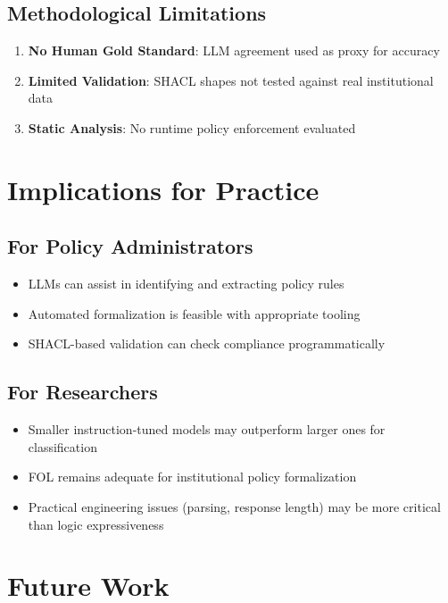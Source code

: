 \subsection{Methodological Limitations}

\begin{enumerate}
    \item \textbf{No Human Gold Standard}: LLM agreement used as proxy for accuracy
    \item \textbf{Limited Validation}: SHACL shapes not tested against real institutional data
    \item \textbf{Static Analysis}: No runtime policy enforcement evaluated
\end{enumerate}

\section{Implications for Practice}

\subsection{For Policy Administrators}

\begin{itemize}
    \item LLMs can assist in identifying and extracting policy rules
    \item Automated formalization is feasible with appropriate tooling
    \item SHACL-based validation can check compliance programmatically
\end{itemize}

\subsection{For Researchers}

\begin{itemize}
    \item Smaller instruction-tuned models may outperform larger ones for classification
    \item FOL remains adequate for institutional policy formalization
    \item Practical engineering issues (parsing, response length) may be more critical than logic expressiveness
\end{itemize}

\section{Future Work}

